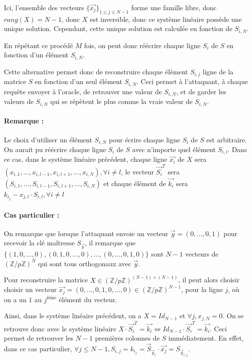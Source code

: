 \documentclass[9pt]{extarticle}
\begin{document}
Ici, l'ensemble des vecteurs $\{\vec{x_j}\}_{1 \leq j \leq N-1}$ forme une famille libre, donc $rang(X) = N-1$, donc $X$ est inversible, donc ce système linéaire possède une unique solution. Cependant, cette unique solution est calculée en fonction de $S_{i,N}$.

En répétant ce procédé $M$ fois, on peut donc réécrire chaque ligne $S_i$ de $S$ en fonction d'un élément $S_{i,N}$.

Cette alternative permet donc de reconstruire chaque élément $S_{i,j}$ ligne  de la matrice $S$ en fonction d'un seul élément $S_{i,N}$. Ceci permet à l'attaquant, à chaque requête envoyer à l'oracle, de retrouver une valeur de $S_{i,N}$, et de garder les valeurs de $S_{i,N}$ qui se répètent le plus comme la vraie valeur de $S_{i,N}$.

\paragraph{Remarque :} Le choix d'utiliser un élément $S_{i,N}$ pour écrire chaque ligne $S_i$ de $S$ est arbitraire. On aurait pu réécrire chaque ligne $S_i$ de $S$ avec n'importe quel élément $S_{i,l}$.
Dans ce cas, dans le système linéaire précédent, chaque ligne $\vec{x_i}$ de $X$ sera $(x_{i,1},\ldots,x_{i,l-1},x_{i,l+1},\ldots,x_{i,N}), \forall i \neq l$, le vecteur $\vec{S_i}^T$ sera $(S_{i,1},\ldots,S_{i,l-1},S_{i,l+1},\ldots,S_{i,N})$ et chaque élément de $\vec{k_i}$ sera $k_{i_j} - x_{j,l} \cdot S_{i,l}, \forall i \neq l$


\paragraph{Cas particulier :} On remarque que lorsque l'attaquant envoie un vecteur $\vec{y} = (0,\ldots,0,1)$ pour recevoir la clé maîtresse $S_{\vec{y}}$, il remarque que $\{(1,0,\ldots,0), (0,1,0,\ldots,0), \ldots, (0,\ldots,0,1,0)\}$ sont $N-1$ vecteurs de $(\mathbb{Z}/p\mathbb{Z})^N$ qui sont tous orthogonaux avec $\vec{y}$.

Pour reconstruire la matrice $X \in (\mathbb{Z}/p\mathbb{Z})^{(N-1) \times (N-1)}$, il peut alors choisir choisir un vecteur $\vec{x_j} = (0,\ldots,0,1,0,\ldots,0) \in (\mathbb{Z}/p\mathbb{Z})^{N-1}$, pour la ligne $j$, où on a un $1$ au $j^{\text{ième}}$ élément du vecteur.

Ainsi, dans le système linéaire précédent, on a $X = Id_{N-1}$ et $\forall j, x_{j,N} = 0$. On se retrouve donc avec le système linéaire $X \cdot \vec{S_i}^T = \vec{k_i} \Leftrightarrow Id_{N-1} \cdot \vec{S_i}^T = \vec{k_i}$. Ceci permet de retrouver les $N-1$ premières colonnes de $S$ immédiatement. En effet, dans ce cas particulier, $\forall j \leq N-1, S_{i,j} = k_{i_j} = \vec{S}_{\vec{y}_i} \cdot \vec{x_j} = S_{\vec{y}_{i,j}}$.
\end{document}
